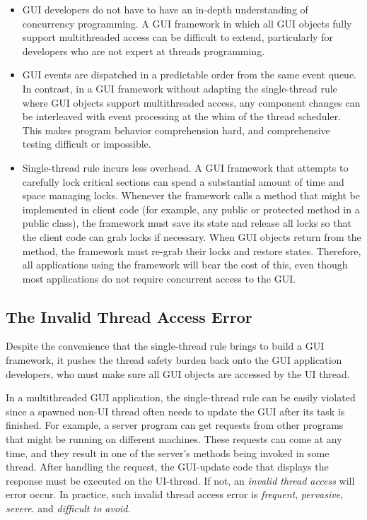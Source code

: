 \begin{itemize}

\item GUI developers do not have to have an in-depth
understanding of concurrency programming. A GUI framework in which all GUI objects
fully support multithreaded access can be difficult to extend, particularly
for developers who are not expert at threads programming.

\item GUI events are dispatched in a predictable order from the same event queue.
In contrast, in a GUI framework without adapting the single-thread rule where GUI objects 
support multithreaded access, any component changes can be interleaved with event
processing at the whim of the thread scheduler. This makes program behavior comprehension hard,
 and comprehensive testing difficult or impossible. 

\item Single-thread rule incurs less overhead.
A GUI framework that attempts to carefully lock critical sections can spend a substantial
amount of time and space managing locks. Whenever the framework calls a method that might
be implemented in client code (for example, any public or protected method in a public class),
the framework must save its state and release all locks so that the client code can grab locks
if necessary. When GUI objects return from the method, the framework must re-grab their locks and
restore states. Therefore, all applications using the framework will bear the cost of this, even though most
applications do not require concurrent access to the GUI.

\end{itemize}


\subsection{The Invalid Thread Access Error}

Despite the convenience that the single-thread rule brings to build a
GUI framework, it pushes the thread safety burden back onto the GUI application developers,
who must make sure all GUI objects are accessed by the UI thread.

In a multithreaded GUI application, the single-thread rule can be
easily violated since a spawned non-UI thread often needs to update
the GUI  after its  task is finished.
For example, a server program can get requests from other programs
that might be running on different machines. These requests can come at any time,
and they result in one of the server's methods being invoked in some thread.
After handling the request, the GUI-update code that displays the response must be executed on the UI-thread.
If not, an \textit{invalid thread access} will error occur. In practice, such
invalid thread access error is \textit{frequent}, \textit{pervasive}, \textit{severe}.
and \textit{difficult to avoid}.

